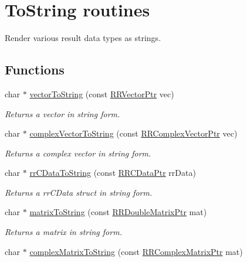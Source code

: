 \hypertarget{group__to_string}{\section{To\+String routines}
\label{group__to_string}
}


Render various result data types as strings.  


\subsection*{Functions}
\begin{DoxyCompactItemize}
\item 
char $\ast$ \hyperlink{group__to_string_ga64ab435eba89b0abf13ae8d86e0a679d}{vector\+To\+String} (const \hyperlink{rrc__types_8h_a3be72d6006034fd349f753d2bf441bf7}{R\+R\+Vector\+Ptr} vec)
\begin{DoxyCompactList}\small\item\em Returns a vector in string form. \end{DoxyCompactList}\item 
char $\ast$ \hyperlink{group__to_string_ga21993774c8d77e0c8988d94d75f8036c}{complex\+Vector\+To\+String} (const \hyperlink{rrc__types_8h_ae05c63419a6ca0575eb327fd04dae4b5}{R\+R\+Complex\+Vector\+Ptr} vec)
\begin{DoxyCompactList}\small\item\em Returns a complex vector in string form. \end{DoxyCompactList}\item 
char $\ast$ \hyperlink{group__to_string_ga505aeb10e21f0ef93770f7723aa12514}{rr\+C\+Data\+To\+String} (const \hyperlink{rrc__types_8h_a9da8b124eb9c3c0045f8926c6a420b4a}{R\+R\+C\+Data\+Ptr} rr\+Data)
\begin{DoxyCompactList}\small\item\em Returns a rr\+C\+Data struct in string form. \end{DoxyCompactList}\item 
char $\ast$ \hyperlink{group__to_string_gaf42846516870bc5cada2bbeb86f02be8}{matrix\+To\+String} (const \hyperlink{rrc__types_8h_ae586a879d30f0823087e42d93464b5dd}{R\+R\+Double\+Matrix\+Ptr} mat)
\begin{DoxyCompactList}\small\item\em Returns a matrix in string form. \end{DoxyCompactList}\item 
char $\ast$ \hyperlink{group__to_string_ga41169534497c2764945c24949c11ddbb}{complex\+Matrix\+To\+String} (const \hyperlink{rrc__types_8h_a8cf9e865d8541d100f153800adbb7c3f}{R\+R\+Complex\+Matrix\+Ptr} mat)

\end{DoxyCompactItemize}

